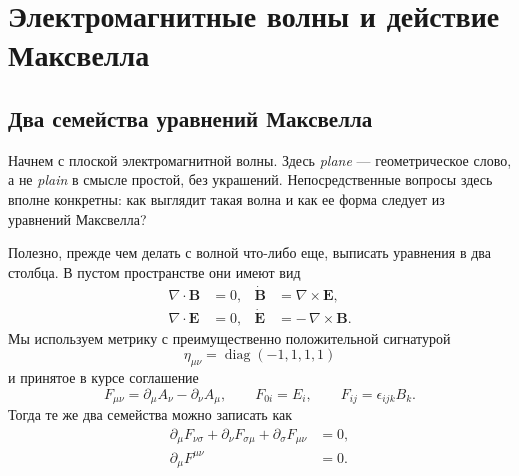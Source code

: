 \chapter{Электромагнитные волны и действие Максвелла}


\section{Два семейства уравнений Максвелла}

Начнем с плоской электромагнитной волны. Здесь \emph{plane} — геометрическое слово, а не \emph{plain} в смысле простой, без украшений. Непосредственные вопросы здесь вполне конкретны: как выглядит такая волна и как ее форма следует из уравнений Максвелла?

Полезно, прежде чем делать с волной что-либо еще, выписать уравнения в два столбца. В пустом пространстве они имеют вид
\begin{align}
\nabla\cdot\mathbf B&=0,
&
\dot{\mathbf B}&=\nabla\times\mathbf E,
\label{eq:homogeneous-vector}
\\
\nabla\cdot\mathbf E&=0,
&
\dot{\mathbf E}&=-\,\nabla\times\mathbf B.
\label{eq:dynamical-vector-vacuum}
\end{align}
Мы используем метрику с преимущественно положительной сигнатурой
\begin{equation}
\eta_{\mu\nu}=\operatorname{diag}(-1,1,1,1)
\end{equation}
и принятое в курсе соглашение
\begin{equation}
F_{\mu\nu}
=
\partial_\mu A_\nu-\partial_\nu A_\mu,
\qquad
F_{0i}=E_i,
\qquad
F_{ij}=\epsilon_{ijk}B_k.
\label{eq:course-f-convention}
\end{equation}
Тогда те же два семейства можно записать как
\begin{align}
\partial_\mu F_{\nu\sigma}
+\partial_\nu F_{\sigma\mu}
+\partial_\sigma F_{\mu\nu}
&=0,
\label{eq:bianchi-l9}
\\
\partial_\mu F^{\mu\nu}
&=0.
\label{eq:vacuum-maxwell-covariant}
\end{align}

